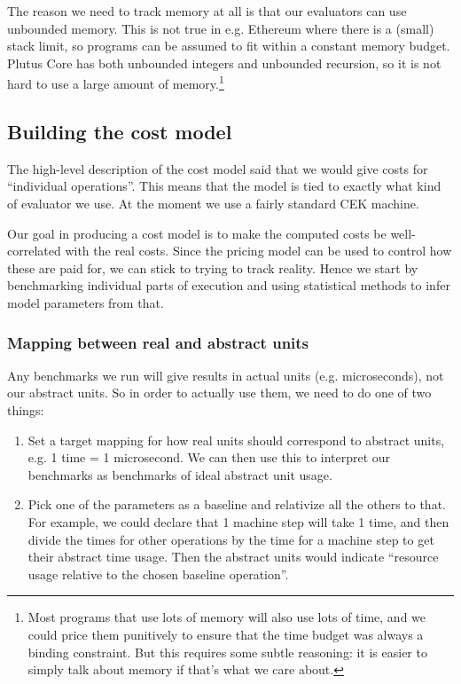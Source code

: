 The reason we need to track memory at all is that our evaluators can use unbounded memory.
This is not true in e.g. Ethereum where there is a (small) stack limit, so programs can be assumed to fit within a constant memory budget.
Plutus Core has both unbounded integers and unbounded recursion, so it is not hard to use a large amount of memory.\footnote{
Most programs that use lots of memory will also use lots of time, and we could price them punitively to ensure that the time budget was always a binding constraint.
But this requires some subtle reasoning: it is easier to simply talk about memory if that's what we care about.
}

\subsection{Building the cost model}
The high-level description of the cost model said that we would give costs for ``individual operations''.
This means that the model is tied to exactly what kind of evaluator we use.
At the moment we use a fairly standard CEK machine.


Our goal in producing a cost model is to make the computed costs be well-correlated with the real costs.
Since the pricing model can be used to control how these are paid for, we can stick to trying to track reality.
Hence we start by benchmarking individual parts of execution and using statistical methods to infer model parameters from that.

\subsubsection{Mapping between real and abstract units}
Any benchmarks we run will give results in actual units (e.g. microseconds), not our abstract units.
So in order to actually use them, we need to do one of two things:
\begin{enumerate}
\item
  Set a target mapping for how real units should correspond to abstract units, e.g. 1 \gls{time} = 1 microsecond.
  We can then use this to interpret our benchmarks as benchmarks of ideal abstract unit usage.
\item
  Pick one of the parameters as a baseline and relativize all the others to that.
  For example, we could declare that 1 machine step will take 1 \gls{time}, and then divide the times for other operations by the time for a machine step to get their abstract \gls{time} usage.
  Then the abstract units would indicate ``resource usage relative to the chosen baseline operation''.
\end{enumerate}

